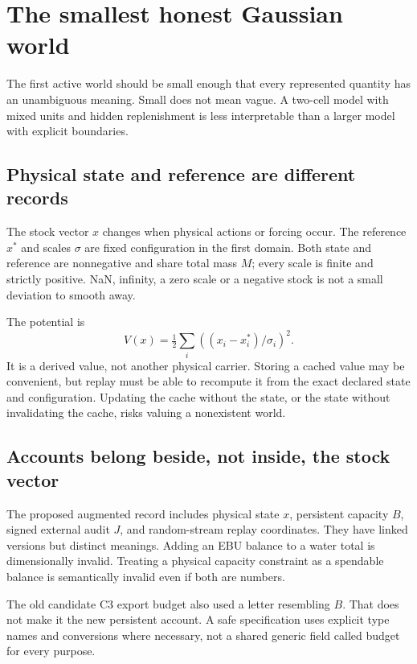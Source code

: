 \chapter{The smallest honest Gaussian world}\label{ch:world-schema}
The first active world should be small enough that every represented
quantity has an unambiguous meaning. Small does not mean vague. A two-cell
model with mixed units and hidden replenishment is less interpretable than
a larger model with explicit boundaries.

\section{Physical state and reference are different records}
The stock vector $x$ changes when physical actions or forcing occur. The
reference $x^*$ and scales $\sigma$ are fixed configuration in the first
domain. Both state and reference are nonnegative and share total mass $M$;
every scale is finite and strictly positive. NaN, infinity, a zero scale
or a negative stock is not a small deviation to smooth away.

The potential is
\begin{equation}
 V(x)=\tfrac12\sum_i((x_i-x_i^*)/\sigma_i)^2.
\end{equation}
It is a derived value, not another physical carrier. Storing a cached value
may be convenient, but replay must be able to recompute it from the exact
declared state and configuration. Updating the cache without the state, or
the state without invalidating the cache, risks valuing a nonexistent world.

\section{Accounts belong beside, not inside, the stock vector}
The proposed augmented record includes physical state $x$, persistent
capacity $B$, signed external audit $J$, and random-stream replay coordinates.
They have linked versions but distinct meanings. Adding an EBU balance to a
water total is dimensionally invalid. Treating a physical capacity constraint
as a spendable balance is semantically invalid even if both are numbers.

The old candidate C3 export budget also used a letter resembling $B$.
That does not make it the new persistent account. A safe specification
uses explicit type names and conversions where necessary, not a shared
generic field called budget for every purpose.

